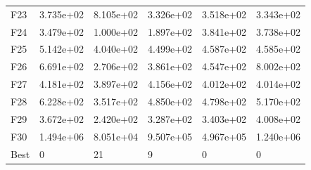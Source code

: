 \begin{tabular}{llllll}
F23  &  3.735e+02 &  8.105e+02 &  3.326e+02 &  3.518e+02 &  3.343e+02 \\
F24  &  3.479e+02 &  1.000e+02 &  1.897e+02 &  3.841e+02 &  3.738e+02 \\
F25  &  5.142e+02 &  4.040e+02 &  4.499e+02 &  4.587e+02 &  4.585e+02 \\
F26  &  6.691e+02 &  2.706e+02 &  3.861e+02 &  4.547e+02 &  8.002e+02 \\
F27  &  4.181e+02 &  3.897e+02 &  4.156e+02 &  4.012e+02 &  4.014e+02 \\
F28  &  6.228e+02 &  3.517e+02 &  4.850e+02 &  4.798e+02 &  5.170e+02 \\
F29  &  3.672e+02 &  2.420e+02 &  3.287e+02 &  3.403e+02 &  4.008e+02 \\
F30  &  1.494e+06 &  8.051e+04 &  9.507e+05 &  4.967e+05 &  1.240e+06 \\
Best &          0 &         21 &          9 &          0 &          0 \\
\bottomrule
\end{tabular}
